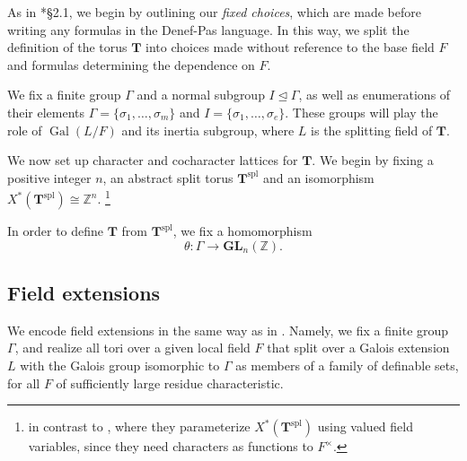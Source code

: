 \documentclass{amsart}
\newcommand{\Z}{{\mathbb Z}}
\newcommand{\GL}{\mathbf {GL}}
\newcommand{\bT}{\mathbf {T}}
\newcommand\spl{\mathrm{spl}}
\DeclareMathOperator{\Gal}{Gal}
\theoremstyle{plain}
\theoremstyle{definition}
\begin{document}
As in \cite{hales:transfert}*{\S 2.1}, we begin by outlining our \emph{fixed choices}, which are made before writing any formulas in the Denef-Pas language.  
In this way, we split the definition of the torus $\bT$ into choices made without reference to the base field $F$ and formulas determining the dependence on $F$.

We fix a finite group $\Gamma$ and a normal subgroup $I \unlhd \Gamma$, as well as enumerations of their elements $\Gamma = \{\sigma_1, \dots, \sigma_m\}$ and $I = \{\sigma_1, \dots, \sigma_e\}$.  These groups will play the role of $\Gal(L/F)$ and its inertia subgroup, where $L$ is the splitting field of $\bT$.

We now set up character and cocharacter lattices for $\bT$.  We begin by fixing a positive integer $n$, an abstract split torus ${\bT}^\spl$ and an isomorphism $X^\ast(\bT^\spl) \cong \Z^n$.
\footnote{in contrast to \cite{cluckers-hales-loeser}, where they parameterize $X^\ast(\bT^\spl)$ using valued field variables, since they need characters as functions to $F^\times$.}

In order to define $\bT$ from $\bT^\spl$, we fix a homomorphism
\[
\theta : \Gamma \to \GL_n(\Z).
\]

\subsection{Field extensions}
 

We encode field extensions in the same way as in \cite{CGH-2}. Namely, we fix a finite group $\Gamma$, and realize all tori over a given local field $F$ that split over a Galois extension $L$ with the Galois group 
isomorphic to $\Gamma$ as members of a family of definable sets, for all $F$ of sufficiently large residue characteristic. 
\end{document}
